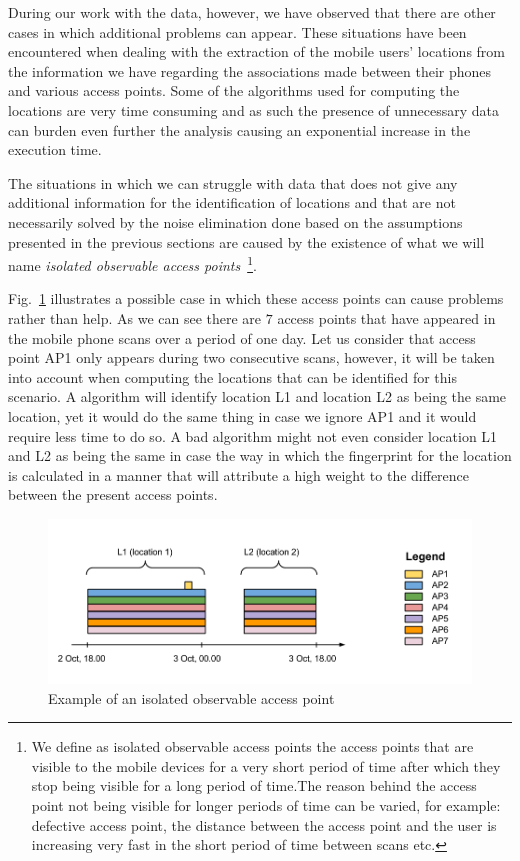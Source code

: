 During our work  with the data, however, we have observed that there are
other cases in which additional problems can appear. These situations have
been encountered when dealing with the extraction of the mobile users' locations
from the information we have regarding the associations made between their
phones and various access points. Some of the algorithms used for computing the
locations are very time consuming and as such the presence of unnecessary data
can burden even further the analysis causing an exponential increase in the
execution time.

The situations in which we can struggle with data that does not give any
additional information for the identification of locations and that are not
necessarily solved by the noise elimination done based on the assumptions
presented in the previous sections are caused by the existence of what we will
name \textit{isolated observable access points}~\footnote{We define as isolated
observable access points the access points that are visible to the mobile
devices for a very short period of time after which they stop being visible for
a long period of time.The reason behind the access point not being visible for
longer periods of time can be varied, for example: defective access point, the
distance between the access point and the user is increasing very fast in the
short period of time between scans etc.}. 

Fig.~\ref{isolated_ap} illustrates a possible case in which these access points
can cause problems rather than help. As we can see there are $7$ access points
that have appeared in the mobile phone scans over a period of one day. Let us
consider that access point AP1 only appears during two consecutive scans,
however, it will be taken into account when computing the locations that can be
identified for this scenario. A algorithm will identify location L1 and location
L2 as being the same location, yet it would do the same thing in case we ignore
AP1 and it would require less time to do so. A bad algorithm might not even
consider location L1 and L2 as being the same in case the way in which the
fingerprint for the location is calculated in a manner that will attribute a
high weight to the difference between the present access points.

\begin{figure}[ht]
\centering
\includegraphics[height = 0.35\textwidth]{figures/isolated_ap.png}
\caption{Example of an isolated observable access point}
\label{isolated_ap}
\end{figure}

